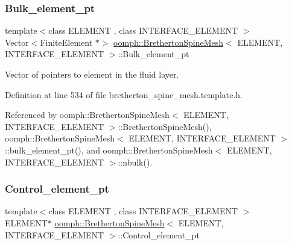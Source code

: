 \subsubsection{\texorpdfstring{Bulk\+\_\+element\+\_\+pt}{Bulk\_element\_pt}}
{\footnotesize\ttfamily template$<$class E\+L\+E\+M\+E\+NT , class I\+N\+T\+E\+R\+F\+A\+C\+E\+\_\+\+E\+L\+E\+M\+E\+NT $>$ \\
Vector$<$Finite\+Element $\ast$$>$ \hyperlink{classoomph_1_1BrethertonSpineMesh}{oomph\+::\+Bretherton\+Spine\+Mesh}$<$ E\+L\+E\+M\+E\+NT, I\+N\+T\+E\+R\+F\+A\+C\+E\+\_\+\+E\+L\+E\+M\+E\+NT $>$\+::Bulk\+\_\+element\+\_\+pt\hspace{0.3cm}{\ttfamily [protected]}}



Vector of pointers to element in the fluid layer. 



Definition at line 534 of file bretherton\+\_\+spine\+\_\+mesh.\+template.\+h.



Referenced by oomph\+::\+Bretherton\+Spine\+Mesh$<$ E\+L\+E\+M\+E\+N\+T, I\+N\+T\+E\+R\+F\+A\+C\+E\+\_\+\+E\+L\+E\+M\+E\+N\+T $>$\+::\+Bretherton\+Spine\+Mesh(), oomph\+::\+Bretherton\+Spine\+Mesh$<$ E\+L\+E\+M\+E\+N\+T, I\+N\+T\+E\+R\+F\+A\+C\+E\+\_\+\+E\+L\+E\+M\+E\+N\+T $>$\+::bulk\+\_\+element\+\_\+pt(), and oomph\+::\+Bretherton\+Spine\+Mesh$<$ E\+L\+E\+M\+E\+N\+T, I\+N\+T\+E\+R\+F\+A\+C\+E\+\_\+\+E\+L\+E\+M\+E\+N\+T $>$\+::nbulk().

\mbox{\label{classoomph_1_1BrethertonSpineMesh_a81ee86c0c747947dab52073c221d53c1}} 
\subsubsection{\texorpdfstring{Control\+\_\+element\+\_\+pt}{Control\_element\_pt}}
{\footnotesize\ttfamily template$<$class E\+L\+E\+M\+E\+NT , class I\+N\+T\+E\+R\+F\+A\+C\+E\+\_\+\+E\+L\+E\+M\+E\+NT $>$ \\
E\+L\+E\+M\+E\+NT$\ast$ \hyperlink{classoomph_1_1BrethertonSpineMesh}{oomph\+::\+Bretherton\+Spine\+Mesh}$<$ E\+L\+E\+M\+E\+NT, I\+N\+T\+E\+R\+F\+A\+C\+E\+\_\+\+E\+L\+E\+M\+E\+NT $>$\+::Control\+\_\+element\+\_\+pt\hspace{0.3cm}{\ttfamily [protected]}}



